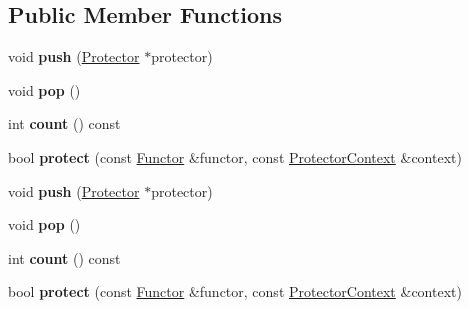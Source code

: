 \subsection*{Public Member Functions}
\begin{DoxyCompactItemize}
\item 
\hypertarget{class_protector_chain_a8c7b27e60434bd0b86cdf4850097c68c}{void {\bfseries push} (\hyperlink{class_protector}{Protector} $\ast$protector)}\label{class_protector_chain_a8c7b27e60434bd0b86cdf4850097c68c}

\item 
\hypertarget{class_protector_chain_a15d1161dc822fc5ddd9769dae0987021}{void {\bfseries pop} ()}\label{class_protector_chain_a15d1161dc822fc5ddd9769dae0987021}

\item 
\hypertarget{class_protector_chain_a486d2f350f1e9dd8be80c785a658f224}{int {\bfseries count} () const }\label{class_protector_chain_a486d2f350f1e9dd8be80c785a658f224}

\item 
\hypertarget{class_protector_chain_a2518ebc9d2140600416c00f60704b3fe}{bool {\bfseries protect} (const \hyperlink{class_functor}{Functor} \&functor, const \hyperlink{class_protector_context}{Protector\+Context} \&context)}\label{class_protector_chain_a2518ebc9d2140600416c00f60704b3fe}

\item 
\hypertarget{class_protector_chain_a8c7b27e60434bd0b86cdf4850097c68c}{void {\bfseries push} (\hyperlink{class_protector}{Protector} $\ast$protector)}\label{class_protector_chain_a8c7b27e60434bd0b86cdf4850097c68c}

\item 
\hypertarget{class_protector_chain_a15d1161dc822fc5ddd9769dae0987021}{void {\bfseries pop} ()}\label{class_protector_chain_a15d1161dc822fc5ddd9769dae0987021}

\item 
\hypertarget{class_protector_chain_a486d2f350f1e9dd8be80c785a658f224}{int {\bfseries count} () const }\label{class_protector_chain_a486d2f350f1e9dd8be80c785a658f224}

\item 
\hypertarget{class_protector_chain_a2518ebc9d2140600416c00f60704b3fe}{bool {\bfseries protect} (const \hyperlink{class_functor}{Functor} \&functor, const \hyperlink{class_protector_context}{Protector\+Context} \&context)}\label{class_protector_chain_a2518ebc9d2140600416c00f60704b3fe}

\end{DoxyCompactItemize}
